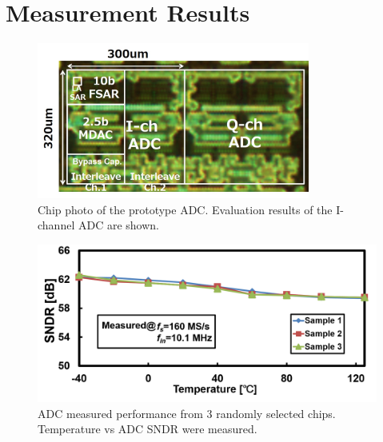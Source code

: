 \section{Measurement Results}
\begin{figure}[!]
\centering
  \includegraphics[width=0.8\textwidth]{figure/chap2/chip.jpg}
  \caption{Chip photo of the prototype ADC. Evaluation results of the I-channel ADC are shown. }
  \label{fig-chip-photo}
\end{figure}
\begin{figure}[!]
\centering
  \includegraphics[width=1\textwidth]{figure/chap2/meas-thermal.png}
  \caption{ADC measured performance from 3 randomly selected chips. Temperature vs ADC SNDR were measured.}
  \label{fig-meas-thermal}
\end{figure}

